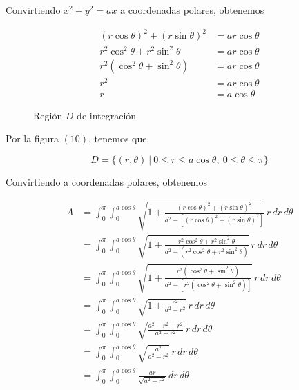 \documentclass[12pt]{exam}
\begin{document}
\begin{questions}
\begin{enumerate}[a)]
\begin{enumerate}
      Convirtiendo $x^2+y^2=ax$ a coordenadas polares, obtenemos

      \begin{align*}
        (r\cos{\theta})^2+(r\sin{\theta})^2 &= ar\cos{\theta} \\
        r^2\cos^2{\theta}+r^2\sin^2{\theta} &= ar\cos{\theta} \\
        r^2(\cos^2{\theta}+\sin^2{\theta}) &= ar\cos{\theta} \\
        r^2&= ar\cos{\theta} \\
        r&= a\cos{\theta} 
      \end{align*}

      \begin{figure}[H]
        \centering
        \label{fig:6b}
        \caption{Región $D$ de integración}
      \end{figure}

      Por la figura $(10)$, tenemos que

      \[
      D=\{(r,\theta)~|~0 \leq r \leq a\cos\theta,~0\leq \theta \leq \pi\}
      \]

      Convirtiendo a coordenadas polares, obtenemos
      
      \begin{align*}
        A
        &= \int_{0}^{\pi}\int_0^{a\cos{\theta}} \sqrt{1+\frac{(r\cos{\theta})^2+(r\sin{\theta})^2}{a^2-[(r\cos{\theta})^2+(r\sin{\theta})^2]}}\,r\,dr\,d\theta\\
        &= \int_{0}^{\pi}\int_0^{a\cos{\theta}} \sqrt{1+\frac{r^2\cos^2{\theta}+r^2\sin^2{\theta}}{a^2-(r^2\cos^2{\theta}+r^2\sin^2{\theta})}}\,r\,dr\,d\theta\\
        &= \int_{0}^{\pi}\int_0^{a\cos{\theta}} \sqrt{1+\frac{r^2(\cos^2{\theta}+\sin^2{\theta})}{a^2-[r^2(\cos^2{\theta}+\sin^2{\theta})]}}\,r\,dr\,d\theta\\
        &= \int_{0}^{\pi}\int_0^{a\cos{\theta}} \sqrt{1+\frac{r^2}{a^2-r^2}}\,r\,dr\,d\theta\\
        &= \int_{0}^{\pi}\int_0^{a\cos{\theta}} \sqrt{\frac{a^2-r^2+r^2}{a^2-r^2}}\,r\,dr\,d\theta\\
        &= \int_{0}^{\pi}\int_0^{a\cos{\theta}} \sqrt{\frac{a^2}{a^2-r^2}}\,r\,dr\,d\theta\\
        &= \int_{0}^{\pi}\int_0^{a\cos{\theta}} \frac{ar}{\sqrt{a^2-r^2}}\,dr\,d\theta
      \end{align*}


\end{enumerate}
\end{enumerate}
\end{questions}
\end{document}
